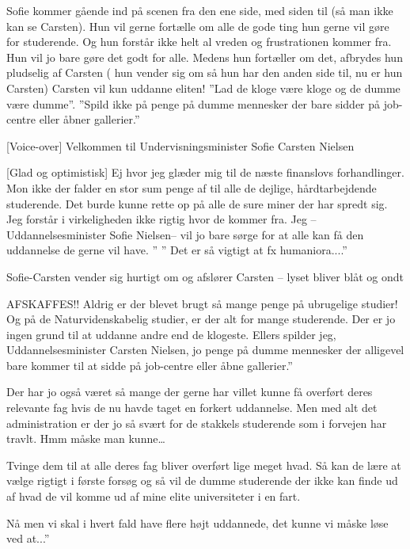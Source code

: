 \documentclass[a4paper,11pt]{article}
\begin{document}
\begin{sketch}

\scene
Sofie kommer gående ind på scenen fra den ene side, med siden til (så man ikke kan se Carsten).
Hun vil gerne fortælle om alle de gode ting hun gerne vil gøre for studerende. Og hun forstår ikke helt al vreden og frustrationen kommer fra. Hun vil jo bare gøre det godt for alle. Medens hun fortæller om det, afbrydes hun pludselig af Carsten ( hun vender sig om så hun har den anden side til, nu er hun Carsten) Carsten vil kun uddanne eliten! ”Lad de kloge være kloge og de dumme være dumme”. ”Spild ikke på penge på dumme mennesker der bare sidder på job-centre eller åbner gallerier.” 

[Voice-over] Velkommen til Undervisningsminister Sofie Carsten Nielsen

[Glad og optimistisk] Ej hvor jeg glæder mig til de næste finanslovs forhandlinger. Mon ikke der falder en stor sum penge af til alle de dejlige, hårdtarbejdende studerende. Det burde kunne rette op på alle de sure miner der har spredt sig. Jeg forstår i virkeligheden ikke rigtig hvor de kommer fra. Jeg --Uddannelsesminister Sofie Nielsen-- vil jo bare sørge for at alle kan få den uddannelse de gerne vil have. ” ” Det er så vigtigt at fx humaniora....”

\scene Sofie-Carsten vender sig hurtigt om og afslører Carsten -- lyset bliver blåt og ondt

AFSKAFFES!! Aldrig er der blevet brugt så mange penge på ubrugelige studier! Og på de Naturvidenskabelig studier, er der alt for mange studerende. Der er jo ingen grund til at uddanne andre end de klogeste. Ellers spilder jeg, Uddannelsesminister Carsten Nielsen, jo penge på dumme mennesker der alligevel bare kommer til at sidde på job-centre eller åbne gallerier.”

 Der har jo også været så mange der gerne har villet kunne få overført deres relevante fag hvis de nu havde taget en forkert uddannelse. Men med alt det administration er der jo så svært for de stakkels studerende som i forvejen har travlt. Hmm måske man kunne\ldots

 Tvinge dem til at alle deres fag bliver overført lige meget hvad. Så kan de lære at vælge rigtigt i første forsøg og så vil de dumme studerende der ikke kan finde ud af hvad de vil komme ud af mine elite universiteter i en fart.

 Nå men vi skal i hvert fald have flere højt uddannede, det kunne vi måske løse ved at...”


\end{sketch}
\end{document}
